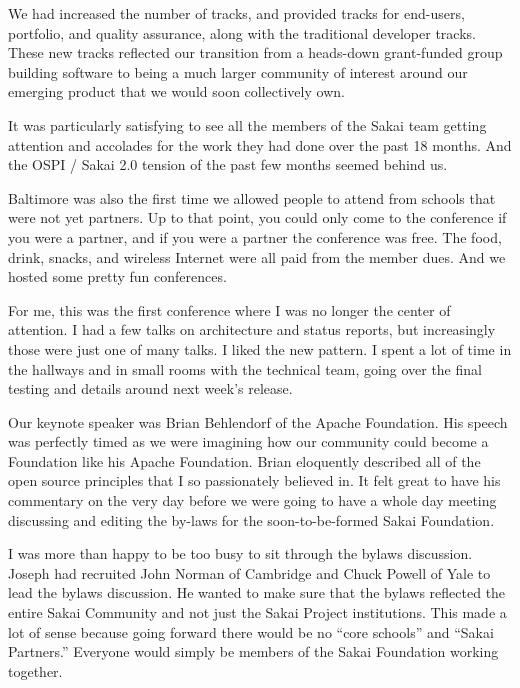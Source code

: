 \documentclass[12pt]{book}
\begin{document}
We had increased the number of tracks, and provided tracks
for end-users, portfolio, and quality assurance, along with the
traditional developer tracks.  These new tracks reflected
our transition from a heads-down grant-funded group building
software to being a much larger community of interest around
our emerging product that we would soon collectively own.

It was particularly satisfying to see all the members of the
Sakai team getting attention and accolades for the work they
had done over the past 18 months.  And the OSPI / Sakai 2.0
tension of the past few months seemed behind
us.

Baltimore was also the first time we allowed people to attend
from schools that were not yet partners.  Up to that point,
you could only come to the conference if you were a partner,
and if you were a partner the conference was free.  The food,
drink, snacks, and wireless Internet were all paid from the
member dues.  And we hosted some pretty fun conferences.


For me, this was the first conference where I was no longer the
center of attention.  I had a few talks on architecture and status
reports, but increasingly those were just one of many talks.  I
liked the new pattern.  I spent a lot of time in the
hallways and in small rooms with the technical team, going over
the final testing and details around next week's release.

Our keynote speaker was Brian Behlendorf of the Apache
Foundation.  His speech was perfectly timed as we were imagining
how our community could become a Foundation like his Apache Foundation.
Brian eloquently described all of the open source principles
that I so passionately believed in.  It felt great to have his
commentary on the very day before we were going to have a
whole day meeting discussing and editing the by-laws for the
soon-to-be-formed Sakai Foundation.

I was more than happy to be too busy to sit through the bylaws
discussion.   Joseph had recruited John Norman of Cambridge and
Chuck Powell of Yale to lead the bylaws discussion.   He wanted
to make sure that the bylaws reflected the entire Sakai Community
and not just the Sakai Project institutions.  This made a lot
of sense because going forward there would be no ``core schools''
and ``Sakai Partners.''  Everyone would simply be members of the
Sakai Foundation working together.
\end{document}
